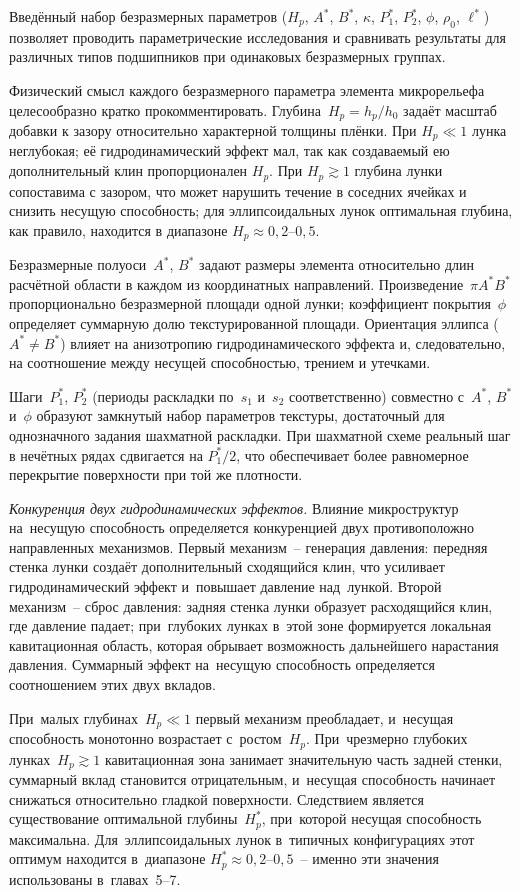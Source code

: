 Введённый набор безразмерных параметров
($H_p$, $A^{*}$, $B^{*}$, $\kappa$, $P_1^{*}$, $P_2^{*}$, $\phi$, $\rho_0$, $\ell^{*}$)
позволяет проводить параметрические исследования и сравнивать результаты
для различных типов подшипников при одинаковых безразмерных группах.

Физический смысл каждого безразмерного параметра элемента
микрорельефа целесообразно кратко прокомментировать.
Глубина~$H_p = h_p/h_0$ задаёт масштаб добавки к зазору
относительно характерной толщины плёнки. При $H_p \ll 1$
лунка неглубокая; её гидродинамический эффект мал, так как
создаваемый ею дополнительный клин пропорционален $H_p$.
При $H_p \gtrsim 1$ глубина лунки сопоставима с зазором,
что может нарушить течение в соседних ячейках и снизить
несущую способность; для эллипсоидальных лунок оптимальная
глубина, как правило, находится в диапазоне
$H_p \approx 0{,}2$--$0{,}5$.

Безразмерные полуоси~$A^{*}$, $B^{*}$ задают размеры элемента
относительно длин расчётной области в каждом из координатных
направлений. Произведение~$\pi A^{*} B^{*}$ пропорционально
безразмерной площади одной лунки; коэффициент
покрытия~$\phi$ определяет суммарную долю текстурированной
площади. Ориентация эллипса ($A^{*} \neq B^{*}$) влияет
на анизотропию гидродинамического эффекта и, следовательно,
на соотношение между несущей способностью, трением и утечками.

Шаги~$P_1^{*}$, $P_2^{*}$ (периоды раскладки по~$s_1$
и~$s_2$ соответственно) совместно с~$A^{*}$, $B^{*}$
и~$\phi$ образуют замкнутый набор параметров текстуры,
достаточный для однозначного задания шахматной раскладки.
При шахматной схеме реальный шаг в нечётных рядах сдвигается
на $P_1^{*}/2$, что обеспечивает более равномерное перекрытие
поверхности при той же плотности.

\textit{Конкуренция двух гидродинамических эффектов.}
Влияние микроструктур на~несущую способность определяется конкуренцией двух противоположно направленных механизмов. Первый механизм~-- генерация давления: передняя стенка лунки создаёт дополнительный сходящийся клин, что усиливает гидродинамический эффект и~повышает давление над~лункой. Второй механизм~-- сброс давления: задняя стенка лунки образует расходящийся клин, где давление падает; при~глубоких лунках в~этой зоне формируется локальная кавитационная область, которая обрывает возможность дальнейшего нарастания давления. Суммарный эффект на~несущую способность определяется соотношением этих двух вкладов.

При~малых глубинах~$H_p \ll 1$ первый механизм преобладает, и~несущая способность монотонно возрастает с~ростом~$H_p$. При~чрезмерно глубоких лунках~$H_p \gtrsim 1$ кавитационная зона занимает значительную часть задней стенки, суммарный вклад становится отрицательным, и~несущая способность начинает снижаться относительно гладкой поверхности. Следствием является существование оптимальной глубины~$H_p^{*}$, при~которой несущая способность максимальна. Для~эллипсоидальных лунок в~типичных конфигурациях этот оптимум находится в~диапазоне $H_p^{*} \approx 0{,}2$--$0{,}5$~-- именно эти значения использованы в~главах~5--7.

